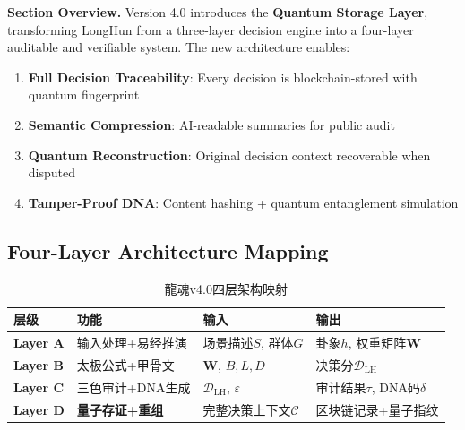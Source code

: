 \noindent\textbf{Section Overview.}
Version 4.0 introduces the \textbf{Quantum Storage Layer},
transforming LongHun from a three-layer decision engine
into a four-layer auditable and verifiable system.
The new architecture enables:
\begin{enumerate}
  \item \textbf{Full Decision Traceability}:
    Every decision is blockchain-stored with quantum fingerprint
  \item \textbf{Semantic Compression}:
    AI-readable summaries for public audit
  \item \textbf{Quantum Reconstruction}:
    Original decision context recoverable when disputed
  \item \textbf{Tamper-Proof DNA}:
    Content hashing + quantum entanglement simulation
\end{enumerate}

\subsection{Four-Layer Architecture Mapping}

\begin{table}[H]
\centering
\caption{龍魂v4.0四层架构映射}
\label{tab:four-layer-v4}
\renewcommand{\arraystretch}{1.35}
\begin{tabular}{p{2.0cm} p{2.8cm} p{3.2cm} p{3.5cm}}
\toprule
\textbf{层级} & \textbf{功能} & \textbf{输入} & \textbf{输出} \\
\midrule
\textbf{Layer A}
  & 输入处理+易经推演
  & 场景描述$S$, 群体$G$
  & 卦象$h$, 权重矩阵$\mathbf{W}$ \\[4pt]
\textbf{Layer B}
  & 太极公式+甲骨文
  & $\mathbf{W}$, $B, L, D$
  & 决策分$\mathcal{D}_{\text{LH}}$ \\[4pt]
\textbf{Layer C}
  & 三色审计+DNA生成
  & $\mathcal{D}_{\text{LH}}$, $\varepsilon$
  & 审计结果$\tau$, DNA码$\delta$ \\[4pt]
\rowcolor{quantumPurple!10}
\textbf{Layer D}
  & \textbf{量子存证+重组}
  & 完整决策上下文$\mathcal{C}$
  & 区块链记录+量子指纹 \\
\bottomrule
\end{tabular}
\end{table}


